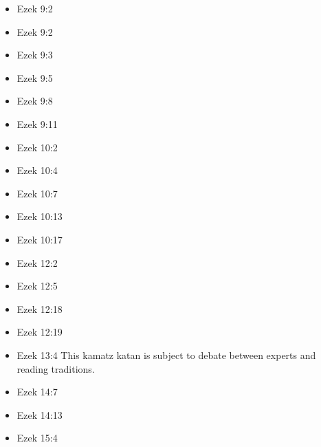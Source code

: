 \documentclass[14pt]{article}
\begin{document}
\begin{multicols}{2}
\begin{itemize}
								\item Ezek 9:2
								
								\item Ezek 9:2
								
								\item Ezek 9:3
								
								\item Ezek 9:5
								
								\item Ezek 9:8
								
								\item Ezek 9:11
								
								\item Ezek 10:2
								
								\item Ezek 10:4
								
								\item Ezek 10:7
								
								\item Ezek 10:13
								
								\item Ezek 10:17
								
								\item Ezek 12:2
								
								\item Ezek 12:5
								
								\item Ezek 12:18
								
								\item Ezek 12:19
								
								\item Ezek 13:4 This kamatz katan is subject to debate between experts and reading traditions.
								
								\item Ezek 14:7
								
								\item Ezek 14:13
								
								\item Ezek 15:4
										

\end{itemize}
\end{multicols}
\end{document}
